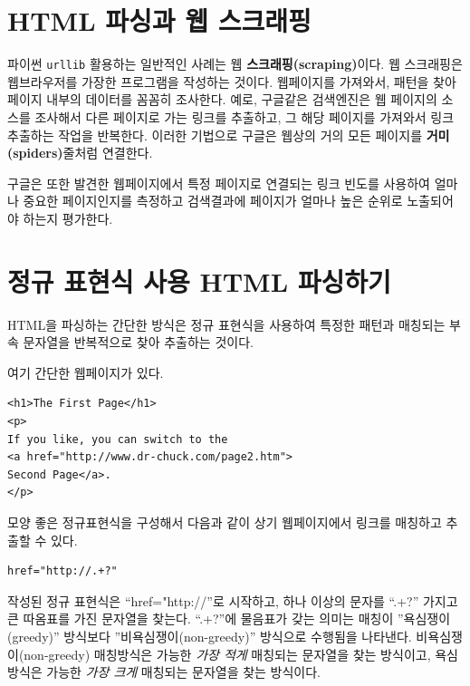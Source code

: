 \section{HTML 파싱과 웹 스크래핑}


파이썬 {\tt urllib} 활용하는 일반적인 사례는 웹 {\bf 스크래핑(scraping)}이다.
웹 스크래핑은 웹브라우저를 가장한 프로그램을 작성하는 것이다.
웹페이지를 가져와서, 패턴을 찾아 페이지 내부의 데이터를 꼼꼼히 조사한다.
예로, 구글같은 검색엔진은 웹 페이지의 소스를 조사해서 다른 페이지로 가는 링크를 추출하고, 그 해당 페이지를 가져와서 링크 추출하는 작업을 반복한다.
이러한 기법으로 구글은 웹상의 거의 모든 페이지를 {\bf 거미(spiders)}줄처럼 연결한다.

구글은 또한 발견한 웹페이지에서 특정 페이지로 연결되는 링크 빈도를 사용하여 얼마나 중요한 페이지인지를 측정하고 
검색결과에 페이지가 얼마나 높은 순위로 노출되어야 하는지 평가한다.

\section{정규 표현식 사용 HTML 파싱하기}

HTML을 파싱하는 간단한 방식은 정규 표현식을 사용하여 특정한 패턴과 매칭되는 부속 문자열을 반복적으로 찾아 추출하는 것이다.

여기 간단한 웹페이지가 있다.

\beforeverb
\begin{verbatim}
<h1>The First Page</h1>
<p>
If you like, you can switch to the
<a href="http://www.dr-chuck.com/page2.htm">
Second Page</a>.
</p>
\end{verbatim}
\afterverb
%

모양 좋은 정규표현식을 구성해서 다음과 같이 상기 웹페이지에서 링크를 매칭하고 추출할 수 있다.

\beforeverb
\begin{verbatim}
href="http://.+?"
\end{verbatim}
\afterverb
%


작성된 정규 표현식은 ``href="http://''로 시작하고, 하나 이상의 문자를 ``.+?'' 가지고 큰 따옴표를 가진 문자열을 찾는다.
``.+?''에 물음표가 갖는 의미는 매칭이 ''욕심쟁이(greedy)'' 방식보다 ''비욕심쟁이(non-greedy)'' 방식으로 수행됨을 나타낸다. 
비욕심쟁이(non-greedy) 매칭방식은 가능한 \emph{가장 적게} 매칭되는 문자열을 찾는 방식이고, 욕심 방식은 가능한 \emph{가장 크게} 매칭되는 문자열을 찾는 방식이다.

